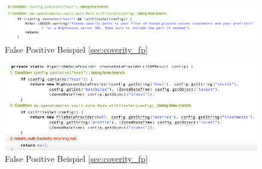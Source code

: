 \documentclass[accentcolor=tud0b,12pt,paper=a4]{tudreport}
\begin{document}
\begin{figure}[h]
\includegraphics[width=1.0\textwidth]{Coverity_FP1}
\caption{False Positive Beispiel \ref{sec:coverity_fp}}
\centering
\label{fig:coverity_fp1}
\end{figure}

\begin{figure}[h]
\includegraphics[width=1.0\textwidth]{Coverity_FP2}
\caption{False Positive Beispiel \ref{sec:coverity_fp}}
\centering
\label{fig:coverity_fp2}
\end{figure}
\end{document}
